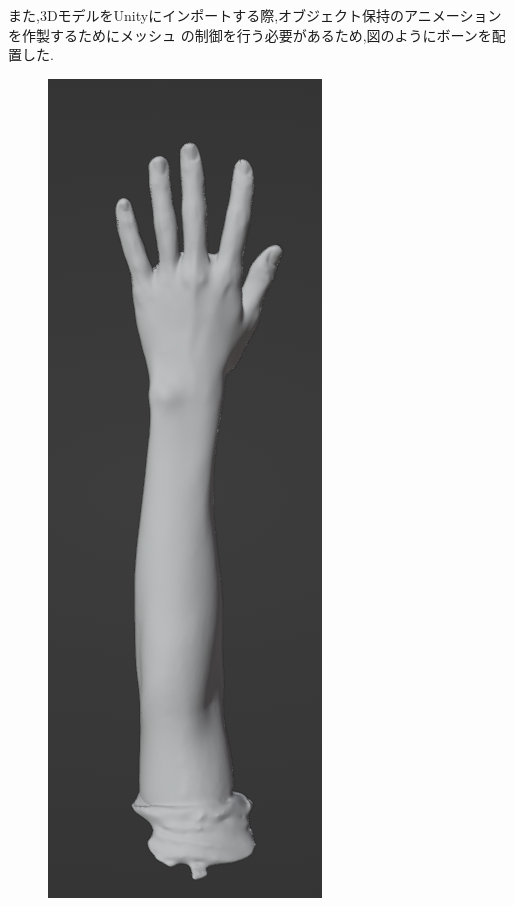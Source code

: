 \documentclass{ltjsreport}
\begin{document}
		また,3DモデルをUnityにインポートする際,オブジェクト保持のアニメーションを作製するためにメッシュ
		の制御を行う必要があるため,図のようにボーンを配置した.
		\begin{figure}[H]
		\centering
		\begin{minipage}{0.15\columnwidth}
		\centering
		\includegraphics[width = \columnwidth]{../figs/handmeshAll.png}

\end{minipage}
\end{figure}
\end{document}

